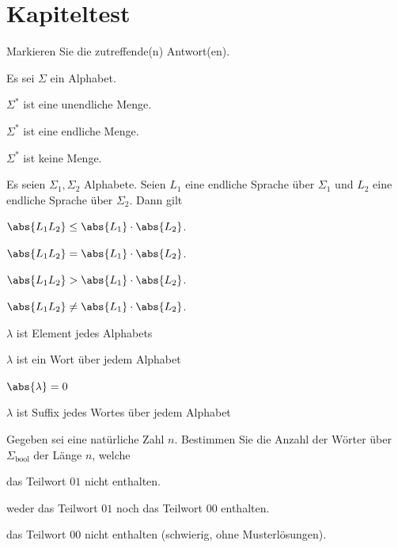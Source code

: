 \clearpage
\shipoutAnswer


\clearpage
\section{Kapiteltest}

\begin{myexercise}\label{myexercise:kp00}
	Markieren Sie die zutreffende(n) Antwort(en).
	\begin{aenum}
		\item Es sei $\Sigma$ ein Alphabet.
		\begin{todolist}
			\item $\Sigma^*$ ist eine unendliche Menge.
			\item $\Sigma^*$ ist eine endliche Menge.
			\item $\Sigma^*$ ist keine Menge.
		\end{todolist}
		\item Es seien $\Sigma_1, \Sigma_2$ Alphabete. Seien $L_1$ eine endliche Sprache über $\Sigma_1$ und $L_2$ eine endliche Sprache über $\Sigma_2$. Dann gilt
		\begin{todolist}
			\item $\abs{L_1L_2} \leq \abs{L_1}\cdot \abs{L_2}$.
			\item $\abs{L_1L_2} = \abs{L_1}\cdot \abs{L_2}$.
			\item $\abs{L_1L_2} > \abs{L_1}\cdot \abs{L_2}$.
			\item $\abs{L_1L_2} \neq \abs{L_1}\cdot \abs{L_2}$.
		\end{todolist}
		\item
		\begin{todolist}
			\item $\lambda$ ist Element jedes Alphabets
			\item $\lambda$ ist ein Wort über jedem Alphabet
			\item $\abs{\lambda} = 0$
			\item $\lambda$ ist Suffix jedes Wortes über jedem Alphabet
		\end{todolist}
	\end{aenum}
\end{myexercise}


\begin{myexercise}\label{myexercise:kp01}
	Gegeben sei eine natürliche Zahl $n$. Bestimmen Sie die Anzahl der Wörter über $\Sigma_{\text{bool}}$ der Länge $n$, welche
	\begin{aenum}
		\item das Teilwort $01$ nicht enthalten.
		\item weder das Teilwort $01$ noch das Teilwort $00$ enthalten.
		\item das Teilwort $00$ nicht enthalten (schwierig, ohne Musterlösungen).
	\end{aenum}
\end{myexercise}

